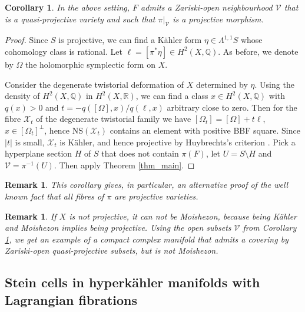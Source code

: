 \documentclass[10pt]{amsart}
\newcommand{\bbQ}{\mathbb{Q}}
\newcommand{\bbR}{\mathbb{R}}
\newcommand{\VV}{\mathcal{V}}
\newcommand{\XX}{\mathcal{X}}
\newtheorem{cor}[defn]{Corollary}
\newtheorem{rem}[defn]{Remark}
\begin{document}
\begin{cor}\label{cor_2}
In the above setting, $F$ admits a Zariski-open neighbourhood $\VV$
that is a quasi-projective variety and such that $\pi|_\VV$ is a projective
morphism.
\end{cor}
\begin{proof}
Since $S$ is projective, we can find a K\"ahler form $\eta\in \Lambda^{1,1}S$
whose cohomology class is rational. Let $\ell = [\pi^*\eta]\in H^2(X,\bbQ)$.
As before, we denote by $\Omega$ the holomorphic symplectic form on $X$.

Consider the degenerate twistorial deformation of $X$ determined by $\eta$.
Using the density of $H^2(X,\bbQ)$ in $H^2(X,\bbR)$, we can find a class $x\in H^2(X,\bbQ)$
with $q(x) > 0$ and $t = - q([\Omega],x)/q(\ell,x)$ arbitrary close to zero.
Then for the fibre $\XX_t$ of the degenerate twistorial family we have $[\Omega_t] = [\Omega] +t\ell$,
$x\in [\Omega_t]^\perp$, hence $\mathrm{NS}(\XX_t)$ contains an element with positive BBF square.
Since $|t|$ is small, $\XX_t$ is K\"ahler, and hence projective by Huybrechts's criterion \cite[Proposition 26.13]{Hu1}.
Pick a hyperplane section $H$ of $S$ that does not contain $\pi(F)$,
let $U = S\setminus H$ and $\VV = \pi^{-1}(U)$. Then apply Theorem \ref{thm_main}.
\end{proof}

\begin{rem}
This corollary gives, in particular, an alternative proof of the well known fact
that all fibres of $\pi$ are projective varieties.
\end{rem}

\begin{rem}
If $X$ is not projective, it can not be Moishezon, because being K\"ahler and
Moishezon implies being projective. Using the open subsets $\VV$ from Corollary \ref{cor_2},
we get an example of a compact complex manifold that admits a covering by
Zariski-open quasi-projective subsets, but is not Moishezon.
\end{rem}

\subsection{Stein cells in hyperk\"ahler manifolds with Lagrangian fibrations}\label{sec_Stein}
\end{document}

